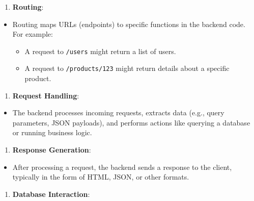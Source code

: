 \documentclass[11pt]{article}
\providecommand{\tightlist}{%
      \setlength{\itemsep}{0pt}\setlength{\parskip}{0pt}}
\begin{document}
\begin{enumerate}
\def\labelenumi{\arabic{enumi}.}
\setcounter{enumi}{2}
\tightlist
\item
  \textbf{Routing}:
\end{enumerate}

\begin{itemize}
\tightlist
\item
  Routing maps URLs (endpoints) to specific functions in the backend
  code. For example:

  \begin{itemize}
  \tightlist
  \item
    A request to \texttt{/users} might return a list of users.
  \item
    A request to \texttt{/products/123} might return details about a
    specific product.
  \end{itemize}
\end{itemize}

\begin{enumerate}
\def\labelenumi{\arabic{enumi}.}
\setcounter{enumi}{3}
\tightlist
\item
  \textbf{Request Handling}:
\end{enumerate}

\begin{itemize}
\tightlist
\item
  The backend processes incoming requests, extracts data (e.g., query
  parameters, JSON payloads), and performs actions like querying a
  database or running business logic.
\end{itemize}

\begin{enumerate}
\def\labelenumi{\arabic{enumi}.}
\setcounter{enumi}{4}
\tightlist
\item
  \textbf{Response Generation}:
\end{enumerate}

\begin{itemize}
\tightlist
\item
  After processing a request, the backend sends a response to the
  client, typically in the form of HTML, JSON, or other formats.
\end{itemize}

\begin{enumerate}
\def\labelenumi{\arabic{enumi}.}
\setcounter{enumi}{5}
\tightlist
\item
  \textbf{Database Interaction}:
\end{enumerate}
\end{document}
